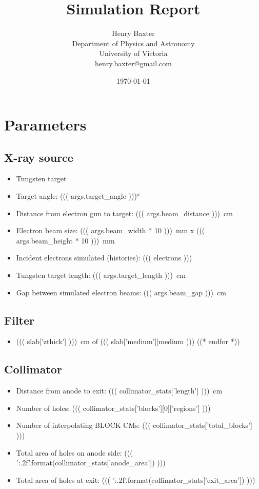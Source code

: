 \documentclass[12pt]{article}
\title{Simulation Report}
\author{
        Henry Baxter \\
                Department of Physics and Astronomy\\
        University of Victoria\\
        henry.baxter@gmail.com
}
\date{\today}
\begin{document}
\maketitle

\tableofcontents

\section{Parameters}

\subsection{X-ray source}
\begin{itemize}
	\item Tungsten target
	\item Target angle: \ang{((( args.target_angle )))}
	\item Distance from electron gun to target: \SI{((( args.beam_distance )))}{\cm}
	\item Electron beam size: \SI{((( args.beam_width * 10 )))}{\mm} x \SI{((( args.beam_height * 10 )))}{\mm}
	\item Incident electrons simulated (histories): ((( electrons )))
	\item Tungsten target length: \SI{((( args.target_length )))}{\cm}
	\item Gap between simulated electron beams: \SI{((( args.beam_gap )))}{\cm}
\end{itemize}

\subsection{Filter}
\begin{itemize}
	((* for slab in _filter['cms'][0]['slabs'] *))
	\item \SI{((( slab['zthick'] )))}{\cm} of ((( slab['medium']|medium )))
	((* endfor *))
\end{itemize}

\subsection{Collimator}
\begin{itemize}
	\item Distance from anode to exit: \SI{((( collimator_stats['length'] )))}{\cm}
	\item Number of holes: ((( collimator_stats['blocks'][0]['regions'] )))
	\item Number of interpolating BLOCK CMs: ((( collimator_stats['total_blocks'] )))
	\item Total area of holes on anode side: ((( '{:.2f}'.format(collimator_stats['anode_area']) )))
	\item Total area of holes at exit: ((( '{:.2f}'.format(collimator_stats['exit_area']) )))
\end{itemize}
\end{document}
